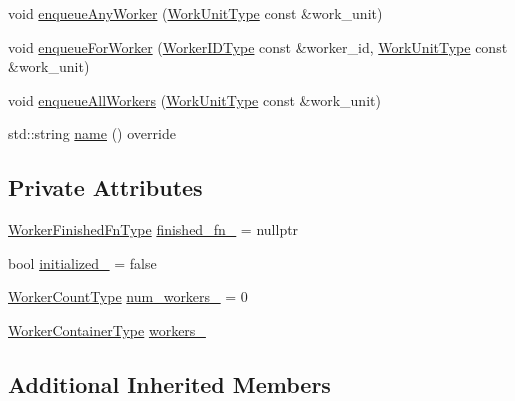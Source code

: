 \begin{DoxyCompactItemize}
\item 
void \hyperlink{structvt_1_1worker_1_1_worker_group_any_a9f8a255853db11824212dcba4faaaf13}{enqueue\+Any\+Worker} (\hyperlink{namespacevt_1_1worker_a59d2fcdafa81fc0af7f921a258e42202}{Work\+Unit\+Type} const \&work\+\_\+unit)
\item 
void \hyperlink{structvt_1_1worker_1_1_worker_group_any_a7f800682c86f876c626d3ee1b9735680}{enqueue\+For\+Worker} (\hyperlink{namespacevt_a656e362091da17b9b93d0655b36e3392}{Worker\+I\+D\+Type} const \&worker\+\_\+id, \hyperlink{namespacevt_1_1worker_a59d2fcdafa81fc0af7f921a258e42202}{Work\+Unit\+Type} const \&work\+\_\+unit)
\item 
void \hyperlink{structvt_1_1worker_1_1_worker_group_any_a87944f965a0e1a918257be0ceff011a5}{enqueue\+All\+Workers} (\hyperlink{namespacevt_1_1worker_a59d2fcdafa81fc0af7f921a258e42202}{Work\+Unit\+Type} const \&work\+\_\+unit)
\item 
std\+::string \hyperlink{structvt_1_1worker_1_1_worker_group_any_a29dc03c300f442508501671d9ec1eecd}{name} () override
\end{DoxyCompactItemize}
\subsection*{Private Attributes}
\begin{DoxyCompactItemize}
\item 
\hyperlink{namespacevt_1_1worker_ae32a174a5348d27aafe73c2debea1a94}{Worker\+Finished\+Fn\+Type} \hyperlink{structvt_1_1worker_1_1_worker_group_any_ad4f81de6e1790126e507cde8e54ed864}{finished\+\_\+fn\+\_\+} = nullptr
\item 
bool \hyperlink{structvt_1_1worker_1_1_worker_group_any_a3075586e7c554a3d2ca71d657a084b5e}{initialized\+\_\+} = false
\item 
\hyperlink{namespacevt_aa93398ea48f2cb6c188512250f7cc248}{Worker\+Count\+Type} \hyperlink{structvt_1_1worker_1_1_worker_group_any_a84a8e36ce6d70e66b712ce04f224fd64}{num\+\_\+workers\+\_\+} = 0
\item 
\hyperlink{structvt_1_1worker_1_1_worker_group_any_ad7e74c099f11c75bc35c838baedaa2cd}{Worker\+Container\+Type} \hyperlink{structvt_1_1worker_1_1_worker_group_any_a370802bca31db13895b73f19d699ea3b}{workers\+\_\+}
\end{DoxyCompactItemize}
\subsection*{Additional Inherited Members}


